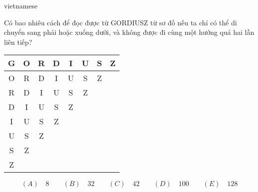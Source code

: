 \documentclass{article}
\begin{document}
\begin{otherlanguage*}{vietnamese}
\begin{problem*}
    Có bao nhiêu cách để đọc được từ GORDIUSZ từ sơ đồ nếu ta chỉ có thể di chuyển sang phải hoặc xuống dưới, và không được đi cùng một hướng quá hai lần liên tiếp?
    \begin{center}
        \begin{tabular}{|c|ccccccc}
        \hline
        G & \multicolumn{1}{c|}{O} & \multicolumn{1}{c|}{R} & \multicolumn{1}{c|}{D} & \multicolumn{1}{c|}{I} & \multicolumn{1}{c|}{U} & \multicolumn{1}{c|}{S} & \multicolumn{1}{c|}{Z} \\ \hline
        O & \multicolumn{1}{c|}{R} & \multicolumn{1}{c|}{D} & \multicolumn{1}{c|}{I} & \multicolumn{1}{c|}{U} & \multicolumn{1}{c|}{S} & \multicolumn{1}{c|}{Z} &                        \\ \cline{1-7}
        R & \multicolumn{1}{c|}{D} & \multicolumn{1}{c|}{I} & \multicolumn{1}{c|}{U} & \multicolumn{1}{c|}{S} & \multicolumn{1}{c|}{Z} &                        &                        \\ \cline{1-6}
        D & \multicolumn{1}{c|}{I} & \multicolumn{1}{c|}{U} & \multicolumn{1}{c|}{S} & \multicolumn{1}{c|}{Z} &                        &                        &                        \\ \cline{1-5}
        I & \multicolumn{1}{c|}{U} & \multicolumn{1}{c|}{S} & \multicolumn{1}{c|}{Z} &                        &                        &                        &                        \\ \cline{1-4}
        U & \multicolumn{1}{c|}{S} & \multicolumn{1}{c|}{Z} &                        &                        &                        &                        &                        \\ \cline{1-3}
        S & \multicolumn{1}{c|}{Z} &                        &                        &                        &                        &                        &                        \\ \cline{1-2}
        Z &                        &                        &                        &                        &                        &                        &                        \\ \cline{1-1}
        \end{tabular}
    \end{center}    
    \[
        (A) \quad 8 \qquad
        (B) \quad 32 \qquad
        (C) \quad 42 \qquad
        (D) \quad 100 \qquad
        (E) \quad 128
    \]
\end{problem*}


\end{otherlanguage*}
\end{document}

